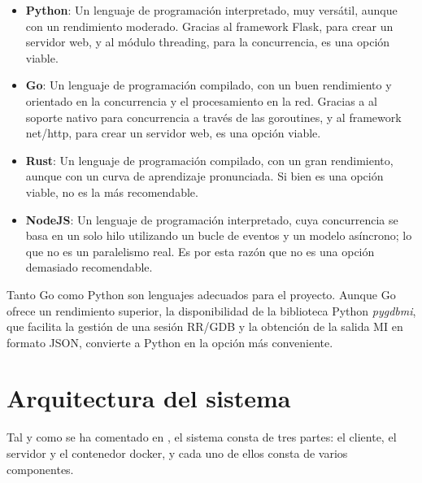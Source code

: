 \begin{itemize}
    \item \textbf{Python}: Un lenguaje de programación interpretado, muy versátil, aunque con un rendimiento moderado. Gracias al framework Flask, para crear un servidor web, y al módulo threading, para la concurrencia, es una opción viable. 
    \item \textbf{Go}: Un lenguaje de programación compilado, con un buen rendimiento y orientado en la concurrencia y el procesamiento en la red. Gracias a al soporte nativo para concurrencia a través de las goroutines, y al framework net/http, para crear un servidor web, es una opción viable.
    \item \textbf{Rust}: Un lenguaje de programación compilado, con un gran rendimiento, aunque con un curva de aprendizaje pronunciada. Si bien es una opción viable, no es la más recomendable. 
    \item \textbf{NodeJS}: Un lenguaje de programación interpretado, cuya concurrencia se basa en un solo hilo utilizando un bucle de eventos y un modelo asíncrono; lo que no es un paralelismo real. Es por esta razón que no es una opción demasiado recomendable. 
\end{itemize}

Tanto Go como Python son lenguajes adecuados para el proyecto. Aunque Go ofrece un rendimiento superior, la disponibilidad de la biblioteca Python \textit{pygdbmi}, que facilita la gestión de una sesión RR/GDB y la obtención de la salida MI en formato JSON, convierte a Python en la opción más conveniente.

\section{Arquitectura del sistema}\label{sec:arquitectura-sistema}

Tal y como se ha comentado en , el sistema consta de tres partes: el cliente, el servidor y el contenedor docker, y cada uno de ellos consta de varios componentes. 

